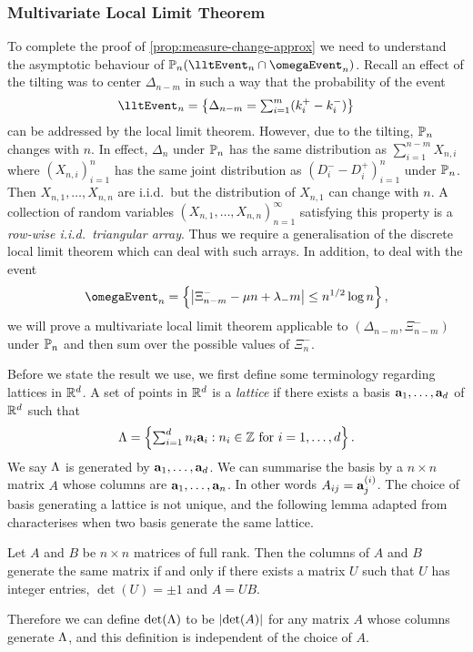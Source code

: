 \subsubsection{Multivariate Local Limit Theorem}

To complete the proof of \cref{prop:measure-change-approx} we need to understand the asymptotic behaviour of $\P_n(\lltEvent_n \cap \omegaEvent_n)$. Recall an effect of the tilting was to center $\Delta_{n-m}$ in such a way that the probability of the event
\begin{equation*}
    \lltEvent_n = \left\{ 
        \Delta_{n-m} = \textstyle \sum_{i=1}^m (k_i^+ - k_i^-)
    \right\}
\end{equation*}
can be addressed by the local limit theorem. However, due to the tilting, $\P_n$ changes with $n$. In effect, $\Delta_n$ under $\P_n$ has the same distribution as $\sum_{i=1}^{n-m} X_{n, i}$ where $(X_{n, i})_{i=1}^n$ has the same joint distribution as $(D_i^- - D_i^+)_{i=1}^n$ under $\P_n$. Then $X_{n, 1}, \ldots, X_{n, n}$ are i.i.d.\ but the distribution of $X_{n, 1}$ can change with $n$. A collection of random variables $(X_{n, 1}, \ldots, X_{n, n})_{n = 1}^{\infty}$ satisfying this property is a \emph{row-wise i.i.d.\ triangular array}. Thus we require a generalisation of the discrete local limit theorem which can deal with such arrays. In addition, to deal with the event
\begin{equation*}
    \omegaEvent_n = \left\{ 
        \abs*{\Xi_{n-m}^- - \mu n + \lambda_- m} \leq n^{1/2} \log n
    \right\},
\end{equation*}
we will prove a multivariate local limit theorem applicable to $(\Delta_{n-m}, \Xi^-_{n-m})$ under $\P_n$ and then sum over the possible values of $\Xi^-_n$.

Before we state the result we use, we first define some terminology regarding lattices in $\R^d$. A set of points in $\R^d$ is a \emph{lattice} if there exists a basis $\va_1, \ldots, \va_d$ of $\R^d$ such that
\begin{equation*}
    \lattice = \left\{ 
        \textstyle \sum_{i=1}^d n_i \va_i : n_i \in \Z \text{ for $i = 1, \ldots, d$}
    \right\}.
\end{equation*}
We say $\lattice$ is generated by $\va_1, \ldots, \va_d$. We can summarise the basis by a $n \times n$ matrix $A$ whose columns are $\va_1, \ldots, \va_n$. In other words $A_{ij} = \va_j^{(i)}$. The choice of basis generating a lattice is not unique, and the following lemma adapted from \cite[Corollary 4.3a]{schrijverTheoryLinearInteger1998} characterises when two basis generate the same lattice.
\begin{lemma}
    Let $A$ and $B$ be $n \times n$ matrices of full rank. Then the columns of $A$ and $B$ generate the same matrix if and only if there exists a matrix $U$ such that $U$ has integer entries, $\det(U) = \pm 1$ and $A = UB$.
\end{lemma}
Therefore we can define $\det(\lattice)$ to be $\abs{\det(A)}$ for any matrix $A$ whose columns generate $\lattice$, and this definition is independent of the choice of $A$.

